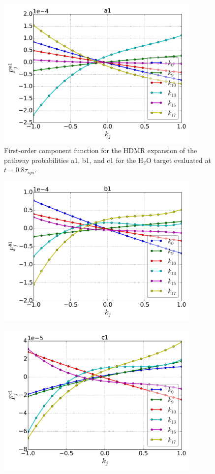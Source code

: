 \begin{figure}[htbp]
	\caption[1$^{st}$ order component function of the pathway probabilities a1, b1, and c1]{First-order component function for the HDMR expansion
of the pathway probabilities a1, b1, and c1 for the H$_2$O target
evaluated at $t=0.8\tau_{ign}$.}
    \begin{center}
	\includegraphics[width=100mm]{figs/chapter3/fig15_a.png}
    \end{center}
\label{ch3:fig15}
\end{figure}
\begin{figure}[htbp]
    \begin{center}
	\includegraphics[width=100mm]{figs/chapter3/fig15_b.png}
    \end{center}
\end{figure}
\begin{figure}[htbp]
    \begin{center}
	\includegraphics[width=100mm]{figs/chapter3/fig15_c.png}
    \end{center}
\end{figure}
